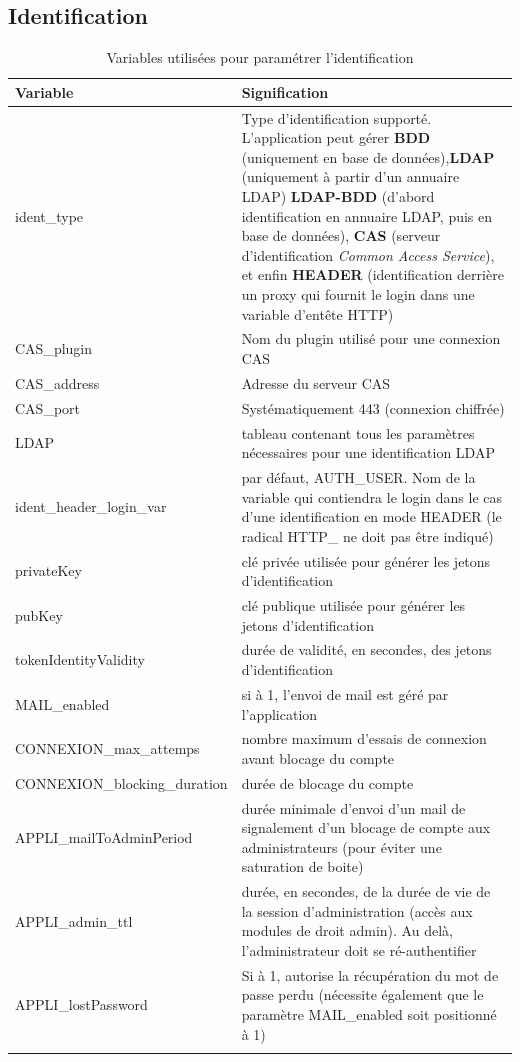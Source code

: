 \subsection{Identification}\label{paramident}
\begin{longtable}{|p{5cm}|p{8cm}|}
\hline
\textbf{Variable} & \textbf{Signification} \\
\hline
\endhead
ident\_type & Type d'identification supporté. L'application peut gérer \textbf{BDD} (uniquement en base de données),\textbf{LDAP} (uniquement à partir d'un annuaire LDAP) \textbf{LDAP-BDD} (d'abord identification en annuaire LDAP, puis en base de données), \textbf{CAS} (serveur d'identification \textit{Common Access Service}), et enfin \textbf{HEADER} (identification derrière un proxy qui fournit le login dans une variable d'entête HTTP)\\
\hline
CAS\_plugin & Nom du plugin utilisé pour une connexion CAS \\
\hline
CAS\_address & Adresse du serveur CAS\\
\hline
CAS\_port & Systématiquement 443 (connexion chiffrée)\\
\hline
LDAP & tableau contenant tous les paramètres nécessaires pour une identification LDAP \\
\hline
ident\_header\_login\_var & par défaut, AUTH\_USER. Nom de la variable qui contiendra le login dans le cas d'une identification en mode HEADER (le radical HTTP\_  ne doit pas être indiqué) \\
\hline
privateKey & clé privée utilisée pour générer les jetons d'identification \\
\hline
pubKey & clé publique utilisée pour générer les jetons d'identification \\
\hline
tokenIdentityValidity & durée de validité, en secondes, des jetons d'identification\\
\hline
MAIL\_enabled & si à 1, l'envoi de mail est géré par l'application \\
\hline
CONNEXION\_max\_attemps & nombre maximum d'essais de connexion avant blocage du compte \\
\hline
CONNEXION\_blocking\_duration & durée de blocage du compte \\
\hline
APPLI\_mailToAdminPeriod & durée minimale d'envoi d'un mail de signalement d'un blocage de compte aux administrateurs (pour éviter une saturation de boite) \\
\hline
APPLI\_admin\_ttl & durée, en secondes, de la durée de vie de la session d'administration (accès aux modules de droit admin). Au delà, l'administrateur doit se ré-authentifier \\
\hline
APPLI\_lostPassword & Si à 1, autorise la récupération du mot de passe perdu (nécessite également que le paramètre MAIL\_enabled soit positionné à 1) \\
\hline

\caption{Variables utilisées pour paramétrer l'identification}
\end{longtable}

